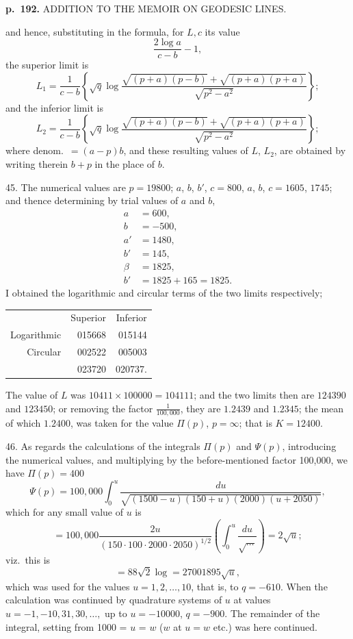\documentclass[11pt,a4paper]{article}
\begin{document}
\clearpage

\noindent
\textbf{p.~192.}  ADDITION TO THE MEMOIR ON GEODESIC LINES.

and hence, substituting in the formula, for $L,c$ its value
\[
\frac{2 \log a}{c - b} - 1,
\]
the superior limit is
\[
L_1 = \frac{1}{c - b}\left\{\sqrt{q}\log\frac{\sqrt{(p + a)(p - b)} + \sqrt{(p + a)(p + a)}}{\sqrt{p^2 - a^2}}\right\};
\]
and the inferior limit is
\[
L_2 = \frac{1}{c - b}\left\{\sqrt{q}\log\frac{\sqrt{(p + a)(p - b)} + \sqrt{(p + a)(p + a)}}{\sqrt{p^2 - a^2}}\right\};
\]
where denom.\ $= (a - p)b$, and these resulting values of $L$, $L_2$, are obtained by writing therein $b + p$ in the place of $b$.

45. The numerical values are $p = 19800$; $a$, $b$, $b'$, $c = 800$, $a$, $b$, $c = 1605$, $1745$; and thence determining by trial values of $a$ and $b$,
\begin{align*}
a &= 600, \\
b &= -500, \\
a' &= 1480, \\
b' &= 145, \\
\beta &= 1825, \\
b' &= 1825 + 165 = 1825.
\end{align*}
I obtained the logarithmic and circular terms of the two limits respectively;
\begin{center}
\begin{tabular}{rrr}
& Superior & Inferior \\
Logarithmic & 015668 & 015144 \\
Circular & 002522 & 005003 \\
& 023720 & 020737.
\end{tabular}
\end{center}

The value of $L$ was $10411 \times 100000 = 104111$; and the two limits then are $124390$ and $123450$; or removing the factor $\frac{1}{100,000}$, they are $1.2439$ and $1.2345$; the mean of which $1.2400$, was taken for the value $\Pi(p)$, $p = \infty$; that is $K = 12400$.

46. As regards the calculations of the integrals $\Pi(p)$ and $\Psi(p)$, introducing the numerical values, and multiplying by the before-mentioned factor 100,000, we have
$\Pi(p) = 400$
\[
\Psi(p) = 100,000 \int_{0}^{u} \frac{du}{\sqrt{(1500 - u)(150 + u)(2000)(u + 2050)}},
\]
which for any small value of $u$ is
\[
= 100,000 \frac{2u}{(150 \cdot 100 \cdot 2000 \cdot 2050)^{1/2}}\left(\int_0^{u}\frac{du}{\sqrt{\ldots}}\right) = 2\sqrt{u};
\]
viz.\ this is
\[
= 88\sqrt{2} \log = 27001895\sqrt{u},
\]
which was used for the values $u = 1, 2, \ldots, 10$, that is, to $q = -610$.  When the calculation was continued by quadrature systems of $u$ at values $u = -1, -10, 31, 30, \ldots, $ up to $u = -10000$, $q = -900$.  The remainder of the integral, setting from 1000 = $u$ = $w$ ($w$ at $u = w$ etc.) was here continued.
\end{document}
